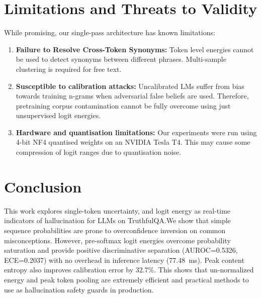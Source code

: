 \documentclass[10pt,twocolumn]{article}
\begin{document}
\section{Limitations and Threats to Validity}
While promising, our single-pass architecture has known limitations:
\begin{enumerate}
    \item \textbf{Failure to Resolve Cross-Token Synonyms:} Token level energies cannot be used to detect synonyms between different phrases. Multi-sample clustering \cite{kuhn2023semantic} is required for free text.
    \item \textbf{Susceptible to calibration attacks:} Uncalibrated LMs suffer from bias towards training n-grams when adversarial false beliefs are used. Therefore, pretraining corpus contamination cannot be fully overcome using just unsupervised logit energies.
    \item \textbf{Hardware and quantisation limitations:} Our experiments were run using 4-bit NF4 quantised weights on an NVIDIA Tesla T4. This may cause some compression of logit ranges due to quantisation noise.
\end{enumerate}

\section{Conclusion}
This work explores single-token uncertainty, and logit energy as real-time indicators of hallucination for LLMs on TruthfulQA.\@ We show that simple sequence probabilities are prone to overconfidence inversion on common misconceptions. However, pre-softmax logit energies overcome probability saturation and provide positive discriminative separation (AUROC=0.5326, ECE=0.2037) with no overhead in inference latency (77.48~ms). Peak content entropy also improves calibration error by 32.7\%. This shows that un-normalized energy and peak token pooling are extremely efficient and practical methods to use as hallucination safety guards in production.



\end{document}
